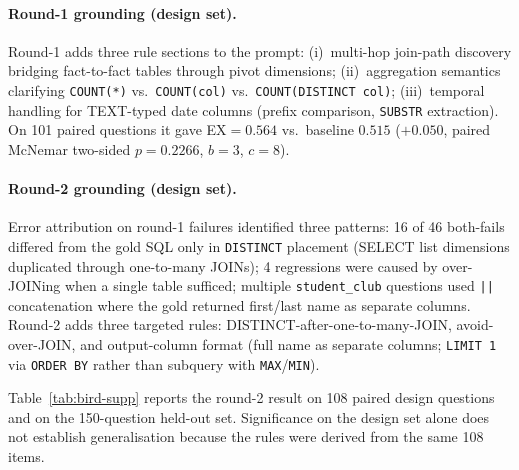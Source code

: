\documentclass[11pt]{article}
\begin{document}
\paragraph{Round-1 grounding (design set).} Round-1 adds three rule sections to the
prompt: (i)~multi-hop join-path discovery bridging fact-to-fact tables through pivot
dimensions; (ii)~aggregation semantics clarifying \texttt{COUNT(*)} vs.\ \texttt{COUNT(col)}
vs.\ \texttt{COUNT(DISTINCT col)}; (iii)~temporal handling for TEXT-typed date columns
(prefix comparison, \texttt{SUBSTR} extraction). On 101 paired questions it gave
EX$=0.564$ vs.\ baseline $0.515$ ($+0.050$, paired McNemar two-sided $p=0.2266$,
$b=3$, $c=8$).

\paragraph{Round-2 grounding (design set).} Error attribution on round-1 failures
identified three patterns: 16 of 46 both-fails differed from the gold SQL only in
\texttt{DISTINCT} placement (SELECT list dimensions duplicated through one-to-many
JOINs); 4 regressions were caused by over-JOINing when a single table sufficed;
multiple \texttt{student\_club} questions used \texttt{||} concatenation where the
gold returned first/last name as separate columns. Round-2 adds three targeted rules:
DISTINCT-after-one-to-many-JOIN, avoid-over-JOIN, and output-column format (full name
as separate columns; \texttt{LIMIT 1} via \texttt{ORDER BY} rather than subquery with
\texttt{MAX}/\texttt{MIN}).

Table~\ref{tab:bird-supp} reports the round-2 result on 108 paired design questions and
on the 150-question held-out set. Significance on the design set alone does not
establish generalisation because the rules were derived from the same 108 items.
\end{document}
